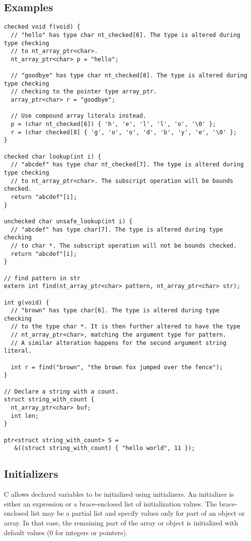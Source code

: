 \subsection{Examples}
\begin{verbatim}
checked void f(void) {
  // "hello" has type char nt_checked[6]. The type is altered during type checking
  // to nt_array_ptr<char>.
  nt_array_ptr<char> p = "hello";

  // "goodbye" has type char nt_checked[8]. The type is altered during type checking
  // checking to the pointer type array_ptr.
  array_ptr<char> r = "goodbye";

  // Use compound array literals instead.
  p = (char nt_checked[6]) { 'h', 'e', 'l', 'l', 'o', '\0' };
  r = (char checked[8] { 'g', 'o', 'o', 'd', 'b', 'y', 'e', '\0' };
}

checked char lookup(int i) {
  // "abcdef" has type char nt_checked[7]. The type is altered during type checking
  // to nt_array_ptr<char>. The subscript operation will be bounds checked.
  return "abcdef"[i];
}

unchecked char unsafe_lookup(int i) {
  // "abcdef" has type char[7]. The type is altered during type checking
  // to char *. The subscript operation will not be bounds checked.
  return "abcdef"[i];
}

// find pattern in str
extern int find(nt_array_ptr<char> pattern, nt_array_ptr<char> str);

int g(void) {
  // "brown" has type char[6]. The type is altered during type checking
  // to the type char *. It is then further altered to have the type
  // nt_array_ptr<char>, matching the argument type for pattern.
  // A similar alteration happens for the second argument string literal.

  int r = find("brown", "the brown fox jumped over the fence");
}

// Declare a string with a count.
struct string_with_count {
  nt_array_ptr<char> buf;
  int len;
}

ptr<struct string_with_count> S =
   &((struct string_with_count) { "hello world", 11 });
\end{verbatim}

\subsection{Initializers}
C allows declared variables to be initialized using initializers.  An initializer
is either an expression or a brace-enclosed list of initialization values.
The brace-enclosed list may be a partial list and specify values only for
part of an object or array.  In that case, the remaining part of the
array or object is initialized with default values (0 for integers or
pointers).


